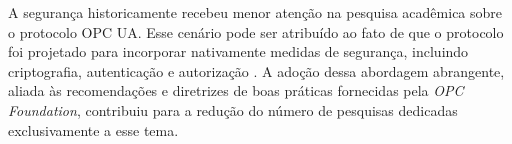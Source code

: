     A segurança historicamente recebeu menor atenção na pesquisa acadêmica sobre o protocolo OPC UA. Esse cenário pode ser atribuído ao fato de que o protocolo foi projetado para incorporar nativamente medidas de segurança, incluindo criptografia, autenticação e autorização \cite{lange2010}. A adoção dessa abordagem abrangente, aliada às recomendações e diretrizes de boas práticas fornecidas pela \textit{OPC Foundation}, contribuiu para a redução do número de pesquisas dedicadas exclusivamente a esse tema.

    

    
    
